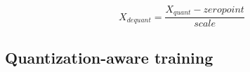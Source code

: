 \begin{equation}
    X_{dequant} = \frac{X_{quant} - zeropoint}{scale}
\end{equation}


\subsection{Quantization-aware training}